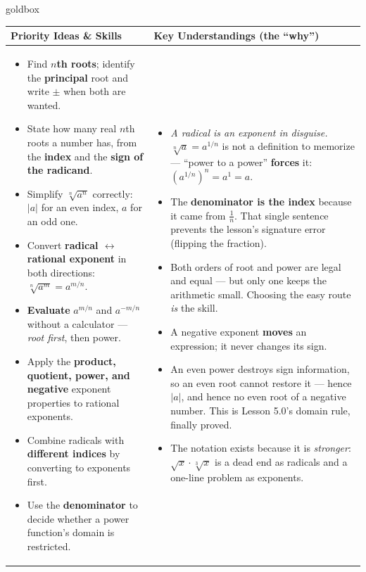 \documentclass[10pt]{article}
\begin{document}
\renewcommand{\arraystretch}{1.4}
\begin{skillbox}{goldbox}
\begin{tabularx}{\linewidth}{@{}X|X@{}}
\textbf{Priority Ideas \& Skills} & \textbf{Key Understandings (the ``why'')} \\[2pt]
\hline
\vspace{-6pt}
\begin{itemize}[leftmargin=1.1em, nosep, after=\vspace{2pt}]
  \item Find \textbf{$n$th roots}; identify the \textbf{principal} root and write $\pm$ when both are wanted.
  \item State how many real $n$th roots a number has, from the \textbf{index} and the \textbf{sign of the radicand}.
  \item Simplify $\sqrt[n]{a^{n}}$ correctly: $|a|$ for an even index, $a$ for an odd one.
  \item Convert \textbf{radical $\leftrightarrow$ rational exponent} in both directions: $\sqrt[n]{a^{m}}=a^{m/n}$.
  \item \textbf{Evaluate} $a^{m/n}$ and $a^{-m/n}$ without a calculator --- \emph{root first}, then power.
  \item Apply the \textbf{product, quotient, power, and negative} exponent properties to rational exponents.
  \item Combine radicals with \textbf{different indices} by converting to exponents first.
  \item Use the \textbf{denominator} to decide whether a power function's domain is restricted.
\end{itemize}
&
\vspace{-6pt}
\begin{itemize}[leftmargin=1.1em, nosep, after=\vspace{2pt}]
  \item \emph{A radical is an exponent in disguise.} $\sqrt[n]{a}=a^{1/n}$ is not a definition to memorize --- ``power to a power'' \textbf{forces} it: $\left(a^{1/n}\right)^{n}=a^{1}=a$.
  \item The \textbf{denominator is the index} because it came from $\frac{1}{n}$. That single sentence prevents the lesson's signature error (flipping the fraction).
  \item Both orders of root and power are legal and equal --- but only one keeps the arithmetic small. Choosing the easy route \emph{is} the skill.
  \item A negative exponent \textbf{moves} an expression; it never changes its sign.
  \item An even power destroys sign information, so an even root cannot restore it --- hence $|a|$, and hence no even root of a negative number. This is Lesson 5.0's domain rule, finally proved.
  \item The notation exists because it is \emph{stronger}: $\sqrt{x}\cdot\sqrt[3]{x}$ is a dead end as radicals and a one-line problem as exponents.
\end{itemize}
\end{tabularx}
\end{skillbox}
\end{document}
